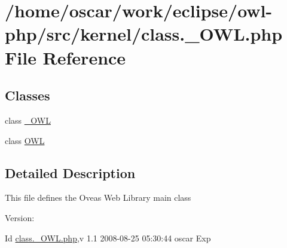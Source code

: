 \hypertarget{class_8__OWL_8php}{
\section{/home/oscar/work/eclipse/owl-php/src/kernel/class.\_\-OWL.php File Reference}
\label{class_8__OWL_8php}
}
\subsection*{Classes}
\begin{CompactItemize}
\item 
class \hyperlink{class__OWL}{\_\-OWL}
\item 
class \hyperlink{classOWL}{OWL}
\end{CompactItemize}


\subsection{Detailed Description}
This file defines the Oveas Web Library main class \begin{Desc}
\item[Version:]\end{Desc}
\begin{Desc}
\item[Id]\hyperlink{class_8__OWL_8php}{class.\_\-OWL.php},v 1.1 2008-08-25 05:30:44 oscar Exp \end{Desc}
